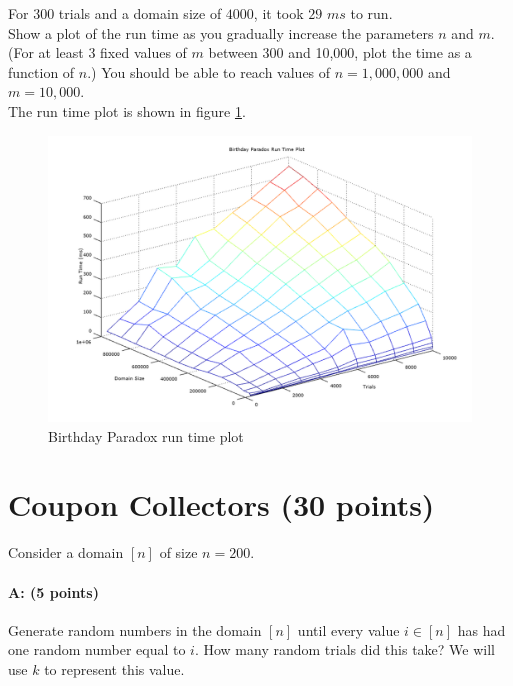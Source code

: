 \documentclass[11pt]{article}
\begin{document}
For $300$ trials and a domain size of $4000$, it took $29$ $ms$ to run.\\

Show a plot of the run time as you gradually increase the parameters $n$ and $m$.  
(For at least 3 fixed values of $m$ between 300 and 10,000, plot the time as a function of $n$.)
You should be able to reach values of $n = 1{,}000{,}000$ and $m = 10{,}000$.  \\

The run time plot is shown in figure \ref{bpruntimes}.

\begin{figure}[!htb]
\centering
\includegraphics[width=5.5in]{figures/bpruntimes.png}
\caption{Birthday Paradox run time plot}
\label{bpruntimes}
\end{figure}

\section{Coupon Collectors (30 points)}

Consider a domain $[n]$ of size $n = 200$.  

\paragraph{A: (5 points)}
Generate random numbers in the domain $[n]$ until every value $i \in [n]$ has had one random number equal to $i$.
How many random trials did this take?  
We will use $k$ to represent this value.  
\end{document}
